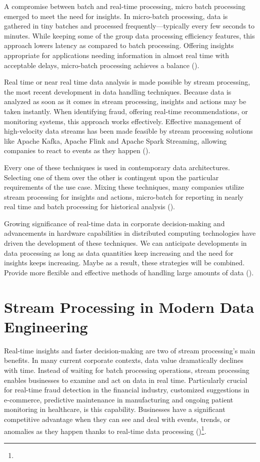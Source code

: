 A compromise between batch and real-time processing, micro batch processing emerged to meet the need for insights. In micro-batch processing, data is gathered in tiny batches and processed frequently—typically every few seconds to minutes. While keeping some of the group data processing efficiency features, this approach lowers latency as compared to batch processing. Offering insights appropriate for applications needing information in almost real time with acceptable delays, micro-batch processing achieves a balance (\cite{Akidau2015TheDM})\footnotemark[36].

Real time or near real time data analysis is made possible by stream processing, the most recent development in data handling techniques. Because data is analyzed as soon as it comes in stream processing, insights and actions may be taken instantly. When identifying fraud, offering real-time recommendations, or monitoring systems, this approach works effectively. Effective management of high-velocity data streams has been made feasible by stream processing solutions like Apache Kafka, Apache Flink and Apache Spark Streaming, allowing companies to react to events as they happen (\cite{Akidau2015TheDM})\footnotemark[36].

Every one of these techniques is used in contemporary data architectures. Selecting one of them over the other is contingent upon the particular requirements of the use case. Mixing these techniques, many companies utilize stream processing for insights and actions, micro-batch for reporting in nearly real time and batch processing for historical analysis (\cite{Akidau2015TheDM})\footnotemark[36].

Growing significance of real-time data in corporate decision-making and advancements in hardware capabilities in distributed computing technologies have driven the development of these techniques. We can anticipate developments in data processing as long as data quantities keep increasing and the need for insights keeps increasing. Maybe as a result, these strategies will be combined. Provide more flexible and effective methods of handling large amounts of data (\cite{Akidau2015TheDM})\footnotemark[36].

\section{Stream Processing in Modern Data Engineering}

Real-time insights and faster decision-making are two of stream processing's main benefits. In many current corporate contexts, data value dramatically declines with time. Instead of waiting for batch processing operations, stream processing enables businesses to examine and act on data in real time. Particularly crucial for real-time fraud detection in the financial industry, customized suggestions in e-commerce, predictive maintenance in manufacturing and ongoing patient monitoring in healthcare, is this capability. Businesses have a significant competitive advantage when they can see and deal with events, trends, or anomalies as they happen thanks to real-time data processing (\cite{akidauStreamingSystemsWhat2018})\footnote[37]{}.

